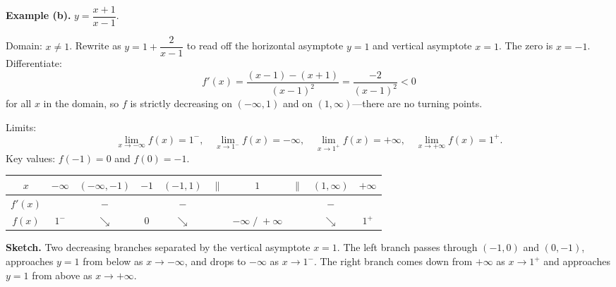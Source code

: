 \documentclass[12pt]{article}
\theoremstyle{definition}
\begin{document}
\begin{center}
\end{center}

\medskip
\noindent\textbf{Example (b).} $y=\dfrac{x+1}{x-1}$.

Domain: $x\ne 1$. Rewrite as $y=1+\dfrac{2}{x-1}$ to read off the horizontal asymptote $y=1$ and vertical asymptote $x=1$. The zero is $x=-1$. Differentiate:
\[
f'(x)=\frac{(x-1)-(x+1)}{(x-1)^2}=\frac{-2}{(x-1)^2}<0
\]
for all $x$ in the domain, so $f$ is strictly decreasing on $(-\infty,1)$ and on $(1,\infty)$---there are no turning points.

Limits:
\[
\lim_{x\to-\infty}f(x)=1^-,
\quad
\lim_{x\to 1^-}f(x)=-\infty,
\quad
\lim_{x\to 1^+}f(x)=+\infty,
\quad
\lim_{x\to+\infty}f(x)=1^+.
\]
Key values: $f(-1)=0$ and $f(0)=-1$.

\medskip
\noindent
\begin{center}
\renewcommand{\arraystretch}{1.35}
\begin{tabular}{c|ccccccccc}
$x$ & $-\infty$ & $(-\infty,-1)$ & $-1$ & $(-1,1)$ & $\|$ & $1$ & $\|$ & $(1,\infty)$ & $+\infty$ \\ \hline
$f'(x)$ & & $-$ & & $-$ & & & & $-$ & \\ \hline
$f(x)$ & $1^-$ & $\searrow$ & $0$ & $\searrow$ & & $-\infty\;/\;+\infty$ & & $\searrow$ & $1^+$
\end{tabular}
\end{center}

\medskip
\noindent\textbf{Sketch.} Two decreasing branches separated by the vertical asymptote $x=1$. The left branch passes through $(-1,0)$ and $(0,-1)$, approaches $y=1$ from below as $x\to-\infty$, and drops to $-\infty$ as $x\to 1^-$. The right branch comes down from $+\infty$ as $x\to 1^+$ and approaches $y=1$ from above as $x\to+\infty$.
\end{document}
